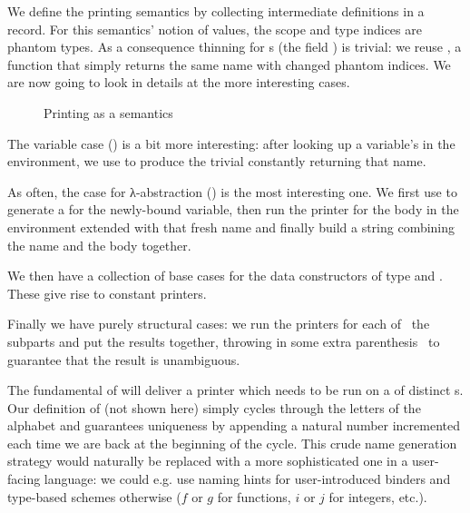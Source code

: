 We define the printing semantics by collecting intermediate definitions in
a record. For this semantics' notion of values, the scope and type indices
are phantom types. As a consequence thinning for s (the field
) is trivial: we reuse ,
a function that simply returns the same name with changed phantom indices.
We are now going to look in details at the more interesting cases.

\begin{figure}[h]
  \caption{Printing as a semantics}
\end{figure}

%
The variable case () is a bit more interesting: after looking up a
variable's  in the environment, we use  to produce the
trivial  constantly returning that name.


As often, the case for λ-abstraction () is the most interesting one.
We first use  to generate a  for the newly-bound variable,
then run the printer for the body in the environment extended with that fresh
name and finally build a string combining the name and the body together.


We then have a collection of base cases for the data constructors of type
 and . These give rise to constant printers.


Finally we have purely structural cases: we run the printers for each of~
the subparts and put the results together, throwing in some extra parenthesis~
to guarantee that the result is unambiguous.



The fundamental  of  will deliver a printer which needs to be run
on a  of distinct s. Our definition of  (not
shown here) simply cycles through the letters of the alphabet and guarantees
uniqueness by appending a natural number incremented each time we are back at
the beginning of the cycle. This crude name generation strategy would naturally
be replaced with a more sophisticated one in a user-facing language: we could
e.g. use naming hints for user-introduced binders and type-based schemes otherwise
($f$ or $g$ for functions, $i$ or $j$ for integers, etc.).

